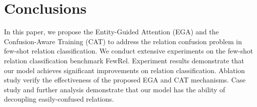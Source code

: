 \documentclass[11pt]{article}
\begin{document}
\section{Conclusions}
In this paper, we propose the Entity-Guided Attention (EGA) and the Confusion-Aware Training (CAT) to address the relation confusion problem in few-shot relation classification.
We conduct extensive experiments on the few-shot relation classification benchmark FewRel.
Experiment results demonstrate that our model achieves significant improvements on relation classification.
Ablation study verify the effectiveness of the proposed EGA and CAT mechanisms.
Case study and further analysis demonstrate that our model has the ability of decoupling easily-confused relations.



\end{document}
